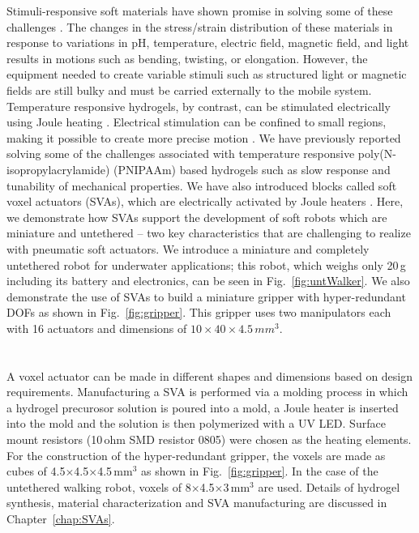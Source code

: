 Stimuli-responsive soft materials have shown promise in solving some of these challenges \cite{Steele2018, Stuart2010,White2013}. The changes in the stress/strain distribution of these materials in response to variations in pH, temperature, electric field, magnetic field, and light results in motions such as bending, twisting, or elongation. However, the equipment needed to create variable stimuli such as structured light \cite{Palagi2016} or magnetic fields \cite{Kim2018} are still bulky and must be carried externally to the mobile system. Temperature responsive hydrogels, by contrast, can be stimulated electrically using Joule heating \cite{Yu2013}. Electrical stimulation can be confined to small regions, making it possible to create more precise motion \cite{Richter2009}. We have previously reported solving some of the challenges associated with temperature responsive poly(N-isopropylacrylamide) (PNIPAAm) based hydrogels such as slow response and tunability of mechanical properties. We have also introduced blocks called soft voxel actuators (SVAs), which are electrically activated by Joule heaters \cite{Khodambashi2021}. Here, we demonstrate how SVAs support the development of soft robots which are miniature and untethered -- two key characteristics that are challenging to realize with pneumatic soft actuators. We introduce a miniature and completely untethered robot for underwater applications; this robot, which weighs only 20\,g including its battery and electronics, can be seen in Fig.~\ref{fig:untWalker}. We also demonstrate the use of SVAs to build a miniature gripper with hyper-redundant DOFs as shown in Fig.~\ref{fig:gripper}. This gripper uses two manipulators each with 16 actuators and dimensions of $10\times 40 \times 4.5\,mm^3$. 

	
\section{}
A voxel actuator can be made in different shapes and dimensions based on design requirements. Manufacturing a SVA is performed via a molding process in which a hydrogel precurosor solution is poured into a mold, a Joule heater is inserted into the mold and the solution is then polymerized with a UV LED. Surface mount  resistors  (10\,ohm  SMD  resistor  0805) were chosen as the heating elements. For the construction of the hyper-redundant gripper, the voxels are made as cubes of 4.5$\times$4.5$\times$4.5\,mm$^3$ as shown in Fig.~\ref{fig:gripper}. In the case of the untethered walking robot, voxels of 8$\times$4.5$\times$3\,mm$^3$ are used. Details of hydrogel synthesis, material characterization and SVA manufacturing are discussed in Chapter~\ref{chap:SVAs}.


